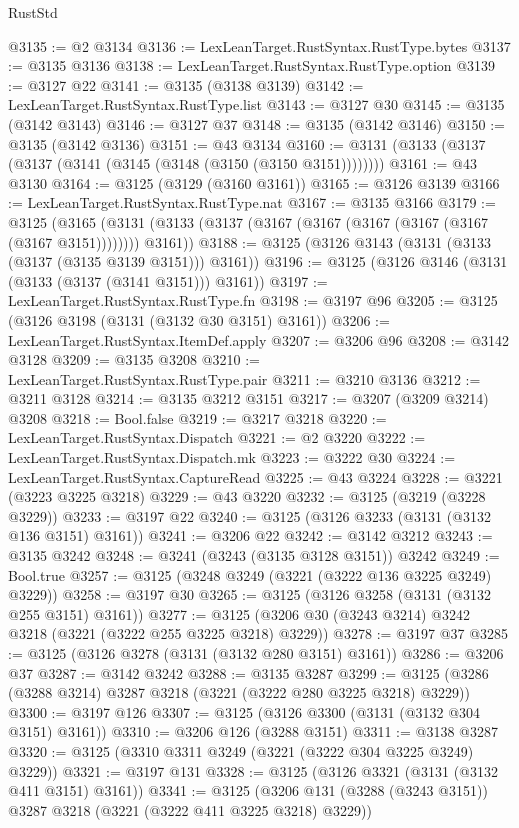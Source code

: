 \begin{lexlean}{RustStd}
\begin{coremodule}
{\begin{coremodule}
{{{{{{{{{{{{{{{{{{{{{{{{{{{{{{{{{{{{{{{{{{{{{@3135 := @2 @3134
@3136 := LexLeanTarget.RustSyntax.RustType.bytes
@3137 := @3135 @3136
@3138 := LexLeanTarget.RustSyntax.RustType.option
@3139 := @3127 @22
@3141 := @3135 (@3138 @3139)
@3142 := LexLeanTarget.RustSyntax.RustType.list
@3143 := @3127 @30
@3145 := @3135 (@3142 @3143)
@3146 := @3127 @37
@3148 := @3135 (@3142 @3146)
@3150 := @3135 (@3142 @3136)
@3151 := @43 @3134
@3160 := @3131 (@3133 (@3137 (@3137 (@3141 (@3145 (@3148 (@3150 (@3150 @3151))))))))
@3161 := @43 @3130
@3164 := @3125 (@3129 (@3160 @3161))
@3165 := @3126 @3139
@3166 := LexLeanTarget.RustSyntax.RustType.nat
@3167 := @3135 @3166
@3179 := @3125
    (@3165 (@3131 (@3133 (@3137 (@3167 (@3167 (@3167 (@3167 (@3167 (@3167 @3151)))))))) @3161))
@3188 := @3125 (@3126 @3143 (@3131 (@3133 (@3137 (@3135 @3139 @3151))) @3161))
@3196 := @3125 (@3126 @3146 (@3131 (@3133 (@3137 (@3141 @3151))) @3161))
@3197 := LexLeanTarget.RustSyntax.RustType.fn
@3198 := @3197 @96
@3205 := @3125 (@3126 @3198 (@3131 (@3132 @30 @3151) @3161))
@3206 := LexLeanTarget.RustSyntax.ItemDef.apply
@3207 := @3206 @96
@3208 := @3142 @3128
@3209 := @3135 @3208
@3210 := LexLeanTarget.RustSyntax.RustType.pair
@3211 := @3210 @3136
@3212 := @3211 @3128
@3214 := @3135 @3212 @3151
@3217 := @3207 (@3209 @3214) @3208
@3218 := Bool.false
@3219 := @3217 @3218
@3220 := LexLeanTarget.RustSyntax.Dispatch
@3221 := @2 @3220
@3222 := LexLeanTarget.RustSyntax.Dispatch.mk
@3223 := @3222 @30
@3224 := LexLeanTarget.RustSyntax.CaptureRead
@3225 := @43 @3224
@3228 := @3221 (@3223 @3225 @3218)
@3229 := @43 @3220
@3232 := @3125 (@3219 (@3228 @3229))
@3233 := @3197 @22
@3240 := @3125 (@3126 @3233 (@3131 (@3132 @136 @3151) @3161))
@3241 := @3206 @22
@3242 := @3142 @3212
@3243 := @3135 @3242
@3248 := @3241 (@3243 (@3135 @3128 @3151)) @3242
@3249 := Bool.true
@3257 := @3125 (@3248 @3249 (@3221 (@3222 @136 @3225 @3249) @3229))
@3258 := @3197 @30
@3265 := @3125 (@3126 @3258 (@3131 (@3132 @255 @3151) @3161))
@3277 := @3125 (@3206 @30 (@3243 @3214) @3242 @3218 (@3221 (@3222 @255 @3225 @3218) @3229))
@3278 := @3197 @37
@3285 := @3125 (@3126 @3278 (@3131 (@3132 @280 @3151) @3161))
@3286 := @3206 @37
@3287 := @3142 @3242
@3288 := @3135 @3287
@3299 := @3125 (@3286 (@3288 @3214) @3287 @3218 (@3221 (@3222 @280 @3225 @3218) @3229))
@3300 := @3197 @126
@3307 := @3125 (@3126 @3300 (@3131 (@3132 @304 @3151) @3161))
@3310 := @3206 @126 (@3288 @3151)
@3311 := @3138 @3287
@3320 := @3125 (@3310 @3311 @3249 (@3221 (@3222 @304 @3225 @3249) @3229))
@3321 := @3197 @131
@3328 := @3125 (@3126 @3321 (@3131 (@3132 @411 @3151) @3161))
@3341 := @3125 (@3206 @131 (@3288 (@3243 @3151)) @3287 @3218 (@3221 (@3222 @411 @3225 @3218) @3229))
}}}}}}}}}}}}}}}}}}}}}}}}}}}}}}}}}}}}}}}}}}}}}
\end{coremodule}}
\end{coremodule}
\end{lexlean}
